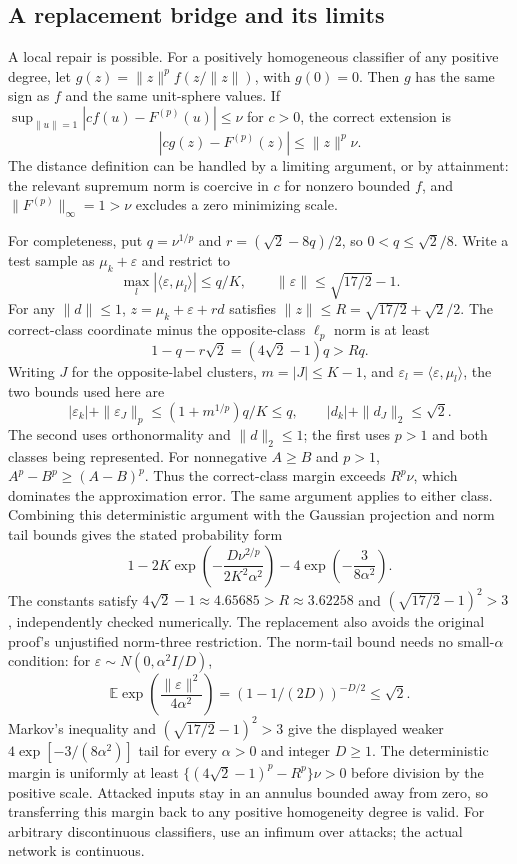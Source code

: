 \documentclass[10pt]{article}
\begin{document}
\subsection*{A replacement bridge and its limits}
A local repair is possible. For a positively homogeneous classifier of any positive degree, let \(g(z)=\|z\|^p f(z/\|z\|)\), with \(g(0)=0\). Then \(g\) has the same sign as \(f\) and the same unit-sphere values. If \(\sup_{\|u\|=1}|cf(u)-F^{(p)}(u)|\le\nu\) for \(c>0\), the correct extension is \[|cg(z)-F^{(p)}(z)|\le\|z\|^p\nu.\] The distance definition can be handled by a limiting argument, or by attainment: the relevant supremum norm is coercive in \(c\) for nonzero bounded \(f\), and \(\|F^{(p)}\|_\infty=1>\nu\) excludes a zero minimizing scale.\par
For completeness, put \(q=\nu^{1/p}\) and \(r=(\sqrt2-8q)/2\), so \(0<q\le\sqrt2/8\). Write a test sample as \(\mu_k+\varepsilon\) and restrict to \[\max_l|\langle\varepsilon,\mu_l\rangle|\le q/K,\qquad
 \|\varepsilon\|\le\sqrt{17/2}-1.\] For any \(\|d\|\le1\), \(z=\mu_k+\varepsilon+rd\) satisfies \(\|z\|\le R=\sqrt{17/2}+\sqrt2/2\). The correct-class coordinate minus the opposite-class \(\ell_p\) norm is at least \[1-q-r\sqrt2=(4\sqrt2-1)q>Rq.\] Writing \(J\) for the opposite-label clusters, \(m=|J|\le K-1\), and \(\varepsilon_l=\langle\varepsilon,\mu_l\rangle\), the two bounds used here are \[|\varepsilon_k|+\|\varepsilon_J\|_p
 \le (1+m^{1/p})q/K\le q,\qquad
 |d_k|+\|d_J\|_2\le\sqrt2.\] The second uses orthonormality and \(\|d\|_2\le1\); the first uses \(p>1\) and both classes being represented. For nonnegative \(A\ge B\) and \(p>1\), \(A^p-B^p\ge(A-B)^p\). Thus the correct-class margin exceeds \(R^p\nu\), which dominates the approximation error. The same argument applies to either class. Combining this deterministic argument with the Gaussian projection and norm tail bounds gives the stated probability form \[1-2K\exp\!\left(-\frac{D\nu^{2/p}}{2K^2\alpha^2}\right)
 -4\exp\!\left(-\frac{3}{8\alpha^2}\right).\] The constants satisfy \(4\sqrt2-1\approx4.65685>R\approx3.62258\) and \((\sqrt{17/2}-1)^2>3\), independently checked numerically. The replacement also avoids the original proof’s unjustified norm-three restriction. The norm-tail bound needs no small-\(\alpha\) condition: for \(\varepsilon\sim N(0,\alpha^2I/D)\), \[{\mathbb E}\exp\!\left(\frac{\|\varepsilon\|^2}{4\alpha^2}\right)
 =(1-1/(2D))^{-D/2}\le\sqrt2.\] Markov’s inequality and \((\sqrt{17/2}-1)^2>3\) give the displayed weaker \(4\exp[-3/(8\alpha^2)]\) tail for every \(\alpha>0\) and integer \(D\ge1\). The deterministic margin is uniformly at least \(\{(4\sqrt2-1)^p-R^p\}\nu>0\) before division by the positive scale. Attacked inputs stay in an annulus bounded away from zero, so transferring this margin back to any positive homogeneity degree is valid. For arbitrary discontinuous classifiers, use an infimum over attacks; the actual network is continuous.\par
\end{document}
